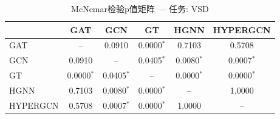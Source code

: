 \begin{table}[htbp]
\centering
\caption{McNemar检验p值矩阵 — 任务: VSD}
\label{tab:mcnemar_VSD}
\begin{tabular}{lccccc}
\toprule
 & GAT & GCN & GT & HGNN & HYPERGCN \\
\midrule
GAT & -- & 0.0910 & 0.0000$^*$ & 0.7103 & 0.5708 \\
GCN & 0.0910 & -- & 0.0405$^*$ & 0.0080$^*$ & 0.0007$^*$ \\
GT & 0.0000$^*$ & 0.0405$^*$ & -- & 0.0000$^*$ & 0.0000$^*$ \\
HGNN & 0.7103 & 0.0080$^*$ & 0.0000$^*$ & -- & 1.0000 \\
HYPERGCN & 0.5708 & 0.0007$^*$ & 0.0000$^*$ & 1.0000 & -- \\
\bottomrule
\end{tabular}
\end{table}